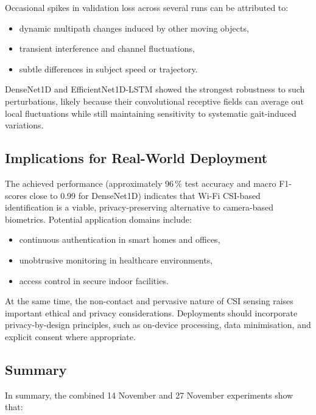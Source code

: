 Occasional spikes in validation loss across several runs can be
attributed to:

\begin{itemize}
    \item dynamic multipath changes induced by other moving objects,
    \item transient interference and channel fluctuations,
    \item subtle differences in subject speed or trajectory.
\end{itemize}

DenseNet1D and EfficientNet1D-LSTM showed the strongest robustness to
such perturbations, likely because their convolutional receptive fields
can average out local fluctuations while still maintaining sensitivity
to systematic gait-induced variations.

\subsection{Implications for Real-World Deployment}

The achieved performance (approximately 96\,\% test accuracy and
macro F1-scores close to 0.99 for DenseNet1D) indicates that Wi-Fi
CSI-based identification is a viable, privacy-preserving alternative to
camera-based biometrics. Potential application domains include:

\begin{itemize}
    \item continuous authentication in smart homes and offices,
    \item unobtrusive monitoring in healthcare environments,
    \item access control in secure indoor facilities.
\end{itemize}

At the same time, the non-contact and pervasive nature of CSI sensing
raises important ethical and privacy considerations. Deployments should
incorporate privacy-by-design principles, such as on-device processing,
data minimisation, and explicit consent where appropriate.

\subsection{Summary}

In summary, the combined 14 November and 27 November experiments show
that:

